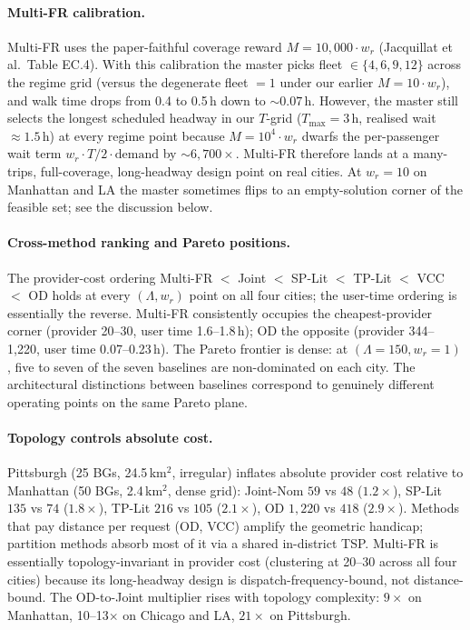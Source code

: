 \paragraph{Multi-FR calibration.} Multi-FR uses the paper-faithful coverage reward $M = 10{,}000 \cdot w_r$ (Jacquillat et al.\ Table EC.4). With this calibration the master picks fleet $\in \{4, 6, 9, 12\}$ across the regime grid (versus the degenerate fleet $=1$ under our earlier $M = 10 \cdot w_r$), and walk time drops from 0.4 to 0.5\,h down to $\sim 0.07$\,h. However, the master still selects the longest scheduled headway in our $T$-grid ($T_{\max}{=}3$\,h, realised wait $\approx 1.5$\,h) at every regime point because $M{=}10^4 \cdot w_r$ dwarfs the per-passenger wait term $w_r \cdot T/2 \cdot \mathrm{demand}$ by $\sim 6{,}700{\times}$. Multi-FR therefore lands at a many-trips, full-coverage, long-headway design point on real cities. At $w_r{=}10$ on Manhattan and LA the master sometimes flips to an empty-solution corner of the feasible set; see the discussion below.

\paragraph{Cross-method ranking and Pareto positions.} The provider-cost ordering Multi-FR $<$ Joint $<$ SP-Lit $<$ TP-Lit $<$ VCC $<$ OD holds at every $(\Lambda, w_r)$ point on all four cities; the user-time ordering is essentially the reverse. Multi-FR consistently occupies the cheapest-provider corner (provider 20--30, user time 1.6--1.8\,h); OD the opposite (provider 344--1{,}220, user time 0.07--0.23\,h). The Pareto frontier is dense: at $(\Lambda{=}150, w_r{=}1)$, five to seven of the seven baselines are non-dominated on each city. The architectural distinctions between baselines correspond to genuinely different operating points on the same Pareto plane.

\paragraph{Topology controls absolute cost.} Pittsburgh (25 BGs, 24.5\,km$^2$, irregular) inflates absolute provider cost relative to Manhattan (50 BGs, 2.4\,km$^2$, dense grid): Joint-Nom $59$ vs $48$ ($1.2{\times}$), SP-Lit $135$ vs $74$ ($1.8{\times}$), TP-Lit $216$ vs $105$ ($2.1{\times}$), OD $1{,}220$ vs $418$ ($2.9{\times}$). Methods that pay distance per request (OD, VCC) amplify the geometric handicap; partition methods absorb most of it via a shared in-district TSP. Multi-FR is essentially topology-invariant in provider cost (clustering at 20--30 across all four cities) because its long-headway design is dispatch-frequency-bound, not distance-bound. The OD-to-Joint multiplier rises with topology complexity: $9{\times}$ on Manhattan, 10--13$\times$ on Chicago and LA, $21{\times}$ on Pittsburgh.

